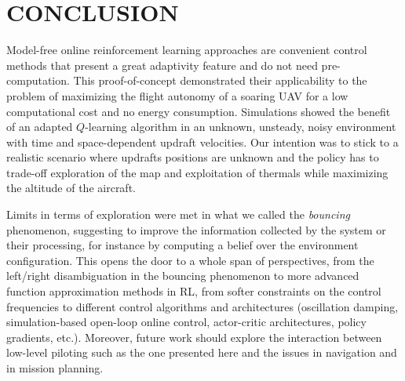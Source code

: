 \documentclass[a4paper, 10pt, conference]{ieeeconf}
\begin{document}
\section{CONCLUSION}
\label{sec:conclu}

Model-free online reinforcement learning approaches are convenient control methods that present a great adaptivity feature and do not need pre-computation. This proof-of-concept demonstrated their applicability to the problem of maximizing the flight autonomy of a soaring UAV for a low computational cost and no energy consumption. Simulations showed the benefit of an adapted $Q$-learning algorithm in an unknown, unsteady, noisy environment with time and space-dependent updraft velocities. Our intention was to stick to a realistic scenario where updrafts positions are unknown and the policy has to trade-off exploration of the map and exploitation of thermals while maximizing the altitude of the aircraft.

Limits in terms of exploration were met in what we called the \textit{bouncing} phenomenon, suggesting to improve the information collected by the system or their processing, for instance by computing a belief over the environment configuration. This opens the door to a whole span of perspectives, from the left/right disambiguation in the bouncing phenomenon to more advanced function approximation methods in RL, from softer constraints on the control frequencies to different control algorithms and architectures (oscillation damping, simulation-based open-loop online control, actor-critic architectures, policy gradients, etc.). Moreover, future work should explore the interaction between low-level piloting such as the one presented here and the issues in navigation and in mission planning.

%
\end{document}
